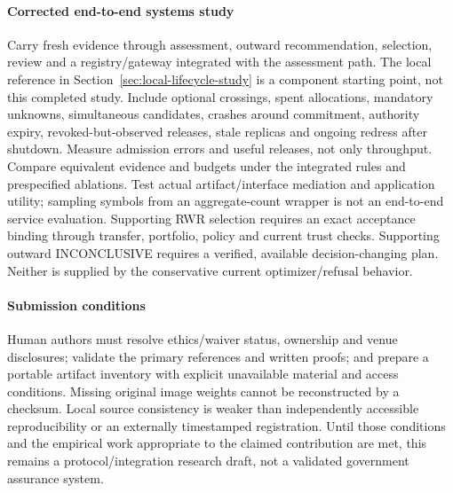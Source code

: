 \paragraph{Corrected end-to-end systems study}
Carry fresh evidence through assessment, outward recommendation, selection,
review and a registry/gateway integrated with the assessment path. The local
reference in Section~\ref{sec:local-lifecycle-study} is a component starting
point, not this completed study. Include optional
crossings, spent allocations, mandatory unknowns, simultaneous candidates,
crashes around commitment, authority expiry, revoked-but-observed releases,
stale replicas and ongoing redress after shutdown. Measure admission errors
and useful releases, not only throughput. Compare equivalent evidence and
budgets under the integrated rules and prespecified ablations. Test actual
artifact/interface mediation and application utility; sampling symbols from
an aggregate-count wrapper is not an end-to-end service evaluation.
Supporting RWR selection requires an exact acceptance binding through transfer,
portfolio, policy and current trust checks. Supporting outward INCONCLUSIVE
requires a verified, available decision-changing plan. Neither is supplied by
the conservative current optimizer/refusal behavior.

\paragraph{Submission conditions}
Human authors must resolve ethics/waiver status, ownership and venue disclosures;
validate the primary references and written proofs; and prepare a portable
artifact inventory with explicit unavailable material and access conditions.
Missing original image weights cannot be reconstructed by a checksum. Local
source consistency is weaker than independently accessible reproducibility
or an externally timestamped registration. Until those conditions and the
empirical work appropriate to the claimed contribution are met, this remains
a protocol/integration research draft, not a validated government assurance system.
